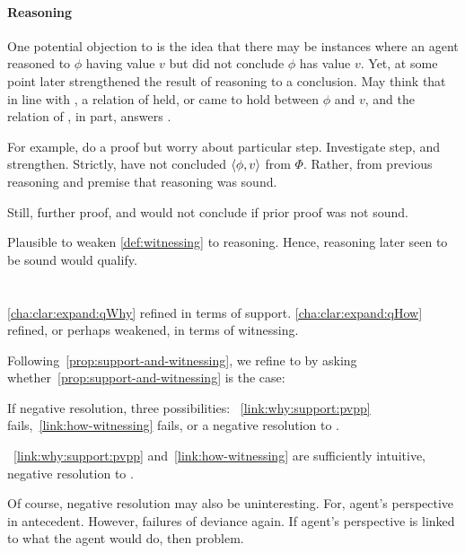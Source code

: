\paragraph{Reasoning}

\begin{note}
  One potential objection to \qWhyV{} is the idea that there may be instances where an agent reasoned to \(\phi\) having value \(v\) but did not conclude \(\phi\) has value \(v\).
  Yet, at some point later strengthened the result of reasoning to a conclusion.
  May think that in line with \supportII{}, a relation of \support{} held, or came to hold between \(\phi\) and \(v\), and the relation of \support{}, in part, answers \qWhyV{}.

  For example, do a proof but worry about particular step.
  Investigate step, and strengthen.
  Strictly, have not concluded \(\langle \phi, v \rangle\) from \(\Phi\).
  Rather, from previous reasoning and premise that reasoning was sound.

  Still, further proof, and would not conclude if prior proof was not sound.

  Plausible to weaken \autoref{def:witnessing} to reasoning.
  Hence, reasoning later seen to be sound would qualify.
\end{note}


\section{\issueInclusion{}}
\label{cha:clar:expand:issue}

\begin{note}
  \autoref{cha:clar:expand:qWhy} refined \qWhy{} in terms of support.
  \autoref{cha:clar:expand:qHow} refined, or perhaps weakened, \qHow{} in terms of witnessing.
\end{note}

\begin{note}
  Following~\autoref{prop:support-and-witnessing}, we refine \issueInclusion{} to \issueConstraint{} by asking whether~\autoref{prop:support-and-witnessing} is the case:

  \rIssueConstraint*

  If negative resolution, three possibilities:
  ~\autoref{link:why:support:pvpp} fails,~\autoref{link:how-witnessing} fails, or a negative resolution to \issueInclusion{}.

  ~\autoref{link:why:support:pvpp} and~\autoref{link:how-witnessing} are sufficiently intuitive, negative resolution to \issueInclusion{}.

  Of course, negative resolution may also be uninteresting.
  For, agent's perspective in antecedent.
  However, failures of deviance again.
  If agent's perspective is linked to what the agent would do, then problem.
\end{note}


